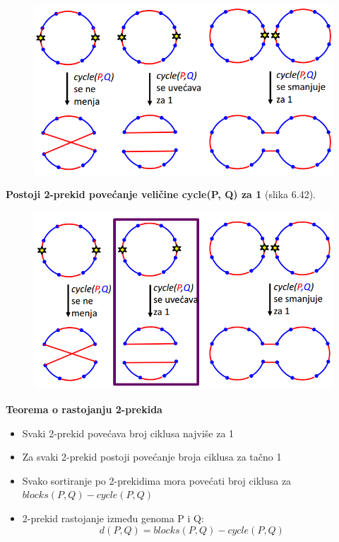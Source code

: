 \begin{figure}[h!]
\centering
\includegraphics[scale=0.5]{poglavlja/6/slike/izmena2prekidima.PNG}
\caption{}
\label{slika:X}
\end{figure}
\newpage
\noindent \textbf{Postoji 2-prekid povećanje veličine cycle(P, Q) za 1} (slika 6.42).
\begin{figure}[h]
\centering
\includegraphics[scale=0.6]{poglavlja/6/slike/izmena2prekidima2.PNG}
\caption{}
\label{slika:X}
\end{figure}

\noindent \textbf{Teorema o rastojanju 2-prekida}
\begin{itemize}
    \item Svaki 2-prekid povećava broj ciklusa najviše za 1
    \item Za svaki 2-prekid postoji povećanje broja ciklusa za tačno 1
    \item Svako sortiranje po 2-prekidima mora povećati broj ciklusa za $blocks(P,Q) - cycle(P, Q)$
    \item 2-prekid rastojanje između genoma P i Q:   $$d(P,Q) = blocks(P, Q) - cycle(P,Q)$$
\end{itemize}

